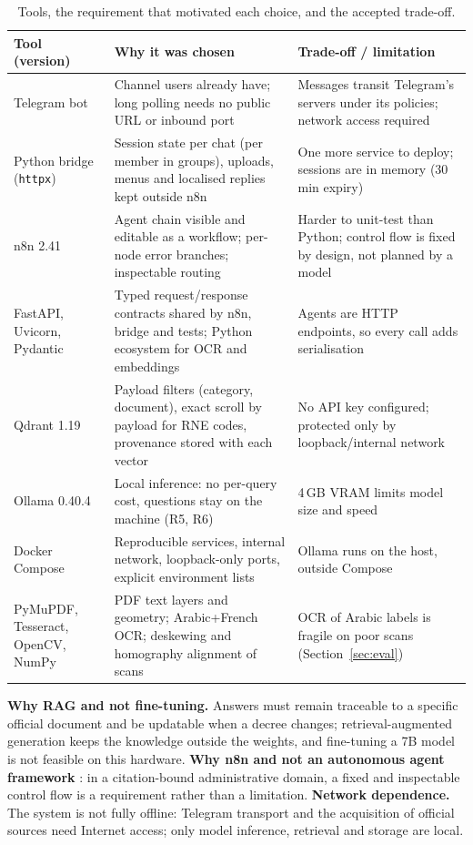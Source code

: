 \documentclass[10pt,a4paper]{article}
\newcommand{\code}[1]{\texttt{\small #1}}
\begin{document}
\begin{table}[H]
  \centering\footnotesize
  \caption{Tools, the requirement that motivated each choice, and the accepted trade-off.}\label{tab:tools}
  \begin{tabularx}{\textwidth}{@{}P{2.55cm} Y Y@{}}
  \toprule
  Tool (version) & Why it was chosen & Trade-off / limitation \\
  \midrule
  Telegram bot \cite{telegram_bot_api} & Channel users already have; long polling needs no public URL or inbound port & Messages transit Telegram's servers under its policies; network access required \\
  Python bridge (\code{httpx}) & Session state per chat (per member in groups), uploads, menus and localised replies kept outside n8n & One more service to deploy; sessions are in memory (30\,min expiry) \\
  n8n 2.41 \cite{n8n} & Agent chain visible and editable as a workflow; per-node error branches; inspectable routing & Harder to unit-test than Python; control flow is fixed by design, not planned by a model \\
  FastAPI, Uvicorn, Pydantic \cite{fastapi,pydantic} & Typed request/response contracts shared by n8n, bridge and tests; Python ecosystem for OCR and embeddings & Agents are HTTP endpoints, so every call adds serialisation \\
  Qdrant 1.19 \cite{qdrant} & Payload filters (category, document), exact scroll by payload for RNE codes, provenance stored with each vector & No API key configured; protected only by loopback/internal network \\
  Ollama 0.40.4 \cite{ollama} & Local inference: no per-query cost, questions stay on the machine (R5, R6) & 4\,GB VRAM limits model size and speed \\
  Docker Compose \cite{docker_compose} & Reproducible services, internal network, loopback-only ports, explicit environment lists & Ollama runs on the host, outside Compose \\
  PyMuPDF, Tesseract, OpenCV, NumPy \cite{pymupdf,smith2007tesseract,bradski2000opencv} & PDF text layers and geometry; Arabic+French OCR; deskewing and homography alignment of scans & OCR of Arabic labels is fragile on poor scans (Section~\ref{sec:eval}) \\
  \bottomrule
  \end{tabularx}
\end{table}

\textbf{Why RAG and not fine-tuning.} Answers must remain traceable to a specific official document and be
updatable when a decree changes; retrieval-augmented generation \cite{lewis2020rag} keeps the knowledge outside
the weights, and fine-tuning a 7B model is not feasible on this hardware. \textbf{Why n8n and not an autonomous
agent framework} \cite{wu2023autogen}: in a citation-bound administrative domain, a fixed and inspectable
control flow is a requirement rather than a limitation. \textbf{Network dependence.} The system is not fully
offline: Telegram transport and the acquisition of official sources need Internet access; only model inference,
retrieval and storage are local.
\end{document}
